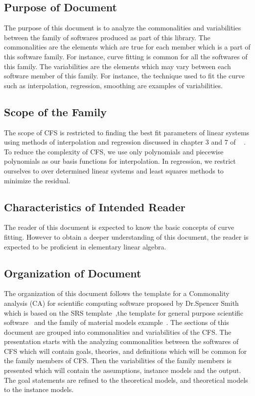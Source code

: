 \documentclass[12pt]{article}
\newcommand{\famname}{CFS} %
\begin{document}
\subsection{Purpose of Document}
The purpose of this document is to analyze the commonalities and variabilities between the family of softwares produced as part of this library. The commonalities are the elements which are true for each member which is a part of this software family. For instance, curve fitting is common for all the softwares of this family. The variabilities are the elements which may vary between each software member of this family. For instance, the technique used to fit the curve such as interpolation, regression, smoothing are examples of variabilities.


\subsection{Scope of the Family}\label{Scope}
The scope of \famname{} is restricted to finding the best fit parameters of linear systems using methods of interpolation and regression discussed in chapter $3$ and $7$ of ~\cite{Health1997} . To reduce the complexity of \famname{}, we use only polynomials and piecewise polynomials as our basis functions for interpolation. In regression, we restrict ourselves to over determined linear systems and least squares methods to minimize the residual.\\


 

\subsection{Characteristics of Intended Reader} 
The reader of this document is expected to know the basic concepts of curve fitting. However to obtain a deeper understanding of this document, the reader is expected to be proficient in elementary linear algebra.

\subsection{Organization of Document}
The organization of this document follows the template for a Commonality analysis (CA) for scientific computing software proposed by Dr.Spencer Smith which is based on the SRS template~\cite{SmithEtAl2007},the template for general purpose scientific software~\cite{Smith2006} and the family of material models example~\cite{SmithMcCutchanAndCarette2017}. The sections of this document are grouped into commonalities and variabilities of the \famname{}. The presentation starts with the analyzing commonalities between the softwares of \famname{} which will contain goals, theories,  and definitions which will be common for the family members of \famname{}. Then the variabilities of the family members is presented which will contain the assumptions, instance models and the output. The goal statements are refined to the theoretical models, and theoretical models to the instance models.
\end{document}
